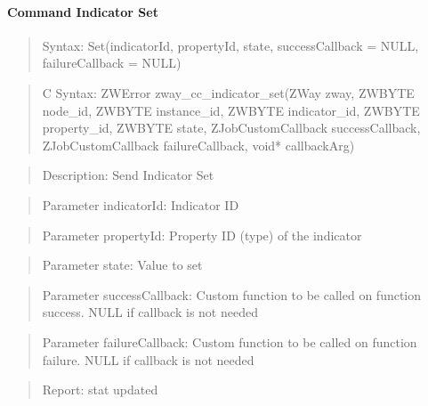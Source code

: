 \paragraph{Command Indicator Set}
\begin{quote}Syntax: Set(indicatorId, propertyId, state, successCallback = NULL, failureCallback = NULL)\end{quote}
\begin{quote}C Syntax: ZWError zway\_cc\_indicator\_set(ZWay zway, ZWBYTE node\_id, ZWBYTE instance\_id, ZWBYTE indicator\_id, ZWBYTE property\_id, ZWBYTE state, ZJobCustomCallback successCallback, ZJobCustomCallback failureCallback, void* callbackArg)\end{quote}
\begin{quote}Description: Send Indicator Set\end{quote}
\begin{quote}Parameter indicatorId: Indicator ID\end{quote}
\begin{quote}Parameter propertyId: Property ID (type) of the indicator\end{quote}
\begin{quote}Parameter state: Value to set\end{quote}
\begin{quote}Parameter successCallback: Custom function to be called on function success. NULL if callback is not needed\end{quote}
\begin{quote}Parameter failureCallback: Custom function to be called on function failure. NULL if callback is not needed\end{quote}
\begin{quote}Report: stat updated\end{quote}

